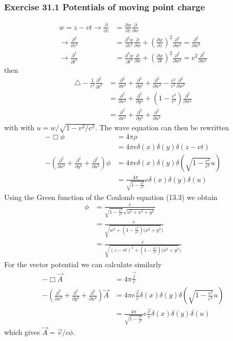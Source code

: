 \documentclass[10pt,a4paper]{article}
\theoremstyle{definition}
\begin{document}
\subsubsection{Exercise 31.1 Potentials of moving point charge}
\begin{align}
    w=z-vt
    \rightarrow
    \frac{\partial}{\partial z}&=\frac{\partial w}{\partial z}\frac{\partial}{\partial w}\\
    \rightarrow\frac{\partial^2}{\partial z^2}&=\frac{\partial^2 w}{\partial z^2}\frac{\partial}{\partial w}+\left(\frac{\partial w}{\partial z}\right)^2\frac{\partial^2}{\partial w^2}=\frac{\partial^2}{\partial w^2}\\
    \rightarrow\frac{\partial^2}{\partial t^2}&=\frac{\partial^2 w}{\partial t^2}\frac{\partial}{\partial w}+\left(\frac{\partial w}{\partial t}\right)^2\frac{\partial^2}{\partial w^2}=v^2\frac{\partial^2}{\partial w^2}
\end{align}
then
\begin{align}
    \triangle-\frac{1}{c^2}\frac{\partial^2}{\partial t^2}&=\frac{\partial^2}{\partial x^2}+\frac{\partial^2}{\partial y^2}+\frac{\partial^2}{\partial w^2}-\frac{v^2}{c^2}\frac{\partial^2}{\partial w^2}\\
    &=\frac{\partial^2}{\partial x^2}+\frac{\partial^2}{\partial y^2}+\left(1-\frac{v^2}{c^2}\right)\frac{\partial^2}{\partial w^2}\\
    &=\frac{\partial^2}{\partial x^2}+\frac{\partial^2}{\partial y^2}+\frac{\partial^2}{\partial u^2}
\end{align}
with with $u=w/\sqrt{1-v^2/c^2}$. The wave equation can then be rewritten
\begin{align}
    -\Box\phi&=4\pi\rho\\
    &=4\pi e\delta(x)\delta(y)\delta(z-vt)\\
    -\left(\frac{\partial^2}{\partial x^2}+\frac{\partial^2}{\partial y^2}+\frac{\partial^2}{\partial u^2}\right)\phi&=4\pi e\delta(x)\delta(y)\delta\left(\sqrt{1-\frac{v^2}{c^2}}u\right)\\
    &=\frac{4\pi}{\sqrt{1-\frac{v^2}{c^2}}} e\delta(x)\delta(y)\delta\left(u\right)
\end{align}
Using the Green function of the Coulomb equation (13.3) we obtain
\begin{align}
    \phi&=\frac{e}{\sqrt{1-\frac{v^2}{c^2}}\sqrt{u^2+x^2+y^2}}\\
    &=\frac{e}{\sqrt{w^2+(1-\frac{v^2}{c^2})(x^2+y^2})}\\
    &=\frac{e}{\sqrt{(z-vt)^2+(1-\frac{v^2}{c^2})(x^2+y^2})}
\end{align}
For the vector potential we can calculate similarly
\begin{align}
    -\Box\vec{A}&=4\pi\frac{\vec{j}}{c}\\
    -\left(\frac{\partial^2}{\partial x^2}+\frac{\partial^2}{\partial y^2}+\frac{\partial^2}{\partial u^2}\right)\vec{A}&=4\pi e\frac{\vec{v}}{c}\delta(x)\delta(y)\delta\left(\sqrt{1-\frac{v^2}{c^2}}u\right)\\
    &=\frac{4\pi}{\sqrt{1-\frac{v^2}{c^2}}} e\frac{\vec{v}}{c}\delta(x)\delta(y)\delta\left(u\right)
\end{align}
which gives $\vec{A}=\vec{v}/c\phi$.
\end{document}
